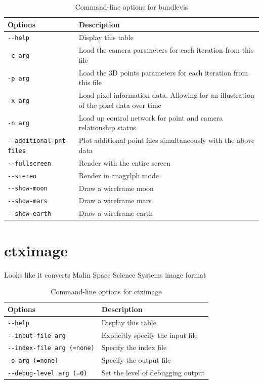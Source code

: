 \begin{longtable}{|l|p{10cm}|}
\caption{Command-line options for bundlevis}
\label{tbl:bundlevis}
\endfirsthead
\endhead
\endfoot
\endlastfoot
\hline
Options & Description \\ \hline \hline
\verb#--help# & Display this table \\ \hline
\verb#-c arg# & Load the camera parameters for each iteration from this file \\ \hline
\verb#-p arg# & Load the 3D points parameters for each iteration from this file \\ \hline
\verb#-x arg# & Load pixel information data. Allowing for an illustration of the pixel data over time \\ \hline
\verb#-n arg# & Load up control network for point and camera relationship status \\ \hline
\verb#--additional-pnt-files# & Plot additional point files simultaneously with the above data \\ \hline
\verb#--fullscreen# & Render with the entire screen \\ \hline
\verb#--stereo# & Render in anagylph mode \\ \hline
\verb#--show-moon# & Draw a wireframe moon \\ \hline
\verb#--show-mars# & Draw a wireframe mars \\ \hline
\verb#--show-earth# & Draw a wireframe earth \\ \hline
\end{longtable}

\section{ctximage}
\label{ctximage}

Looks like it converts Malin Space Science Systems image format

\begin{longtable}{|l|p{10cm}|}
\caption{Command-line options for ctximage}
\label{tbl:ctximage}
\endfirsthead
\endhead
\endfoot
\endlastfoot
\hline
Options & Description \\ \hline \hline
\verb#--help# & Display this table \\ \hline
\verb#--input-file arg# & Explicitly specify the input file \\ \hline
\verb#--index-file arg (=none)# & Specify the index file \\ \hline
\verb#-o arg (=none)# & Specify the output file \\ \hline
\verb#--debug-level arg (=0)# & Set the level of debugging output \\ \hline
\end{longtable}

